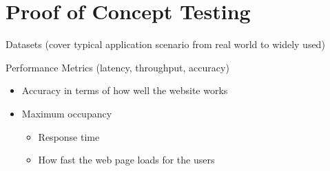 \documentclass{article}
\begin{document}
\newpage


\section{Proof of Concept Testing}
			Datasets (cover typical application scenario from real world to widely used)

Performance Metrics (latency, throughput, accuracy)
\begin{itemize}
	\item Accuracy in terms of how well the website works
	\item Maximum occupancy
		\begin {itemize}
			\item Response time
			\item	How fast the web page loads for the users
		\end{itemize}
\end {itemize}
\end{document}
